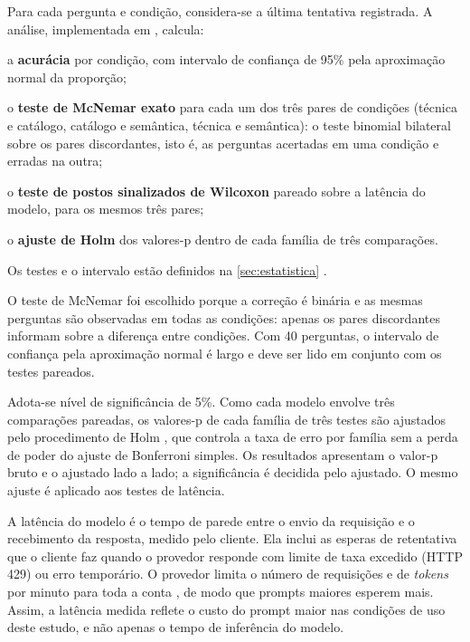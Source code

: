 Para cada pergunta e condição, considera-se a última tentativa registrada.
A análise, implementada em , calcula:
\begin{alineas}
  \item a \textbf{acurácia} por condição, com intervalo de confiança de
        95\% pela aproximação normal da proporção;
  \item o \textbf{teste de McNemar exato} para cada um dos três pares de
        condições (técnica e catálogo, catálogo e semântica, técnica e
        semântica): o teste binomial bilateral sobre os pares discordantes,
        isto é, as perguntas acertadas em uma condição e erradas na outra;
  \item o \textbf{teste de postos sinalizados de Wilcoxon} pareado sobre a
        latência do modelo, para os mesmos três pares;
  \item o \textbf{ajuste de Holm} dos valores-p dentro de cada família de
        três comparações.
\end{alineas}
Os testes e o intervalo estão definidos na \autoref{sec:estatistica}
\cite{mcnemar1947note,fagerland2013mcnemar,wilcoxon1945individual,agresti1998approximate}.

O teste de McNemar foi escolhido porque a correção é binária e as mesmas
perguntas são observadas em todas as condições: apenas os pares
discordantes informam sobre a diferença entre condições. Com 40 perguntas,
o intervalo de confiança pela aproximação normal é largo e deve ser lido
em conjunto com os testes pareados.

Adota-se nível de significância de 5\%. Como cada modelo envolve três
comparações pareadas, os valores-p de cada família de três testes são
ajustados pelo procedimento de Holm \cite{holm1979simple}, que controla a
taxa de erro por família sem a perda de poder do ajuste de Bonferroni
simples. Os resultados apresentam o valor-p bruto e o ajustado lado a lado;
a significância é decidida pelo ajustado. O mesmo ajuste é aplicado aos
testes de latência.

A latência do modelo é o tempo de parede entre o envio da requisição e o
recebimento da resposta, medido pelo cliente. Ela inclui as esperas de
retentativa que o cliente faz quando o provedor responde com limite de taxa
excedido (HTTP 429) ou erro temporário. O provedor limita o número de
requisições e de \textit{tokens} por minuto para toda a conta
\cite{groq_ratelimits}, de modo que prompts maiores esperem mais. Assim, a
latência medida reflete o custo do prompt maior nas condições de uso deste
estudo, e não apenas o tempo de inferência do modelo.

